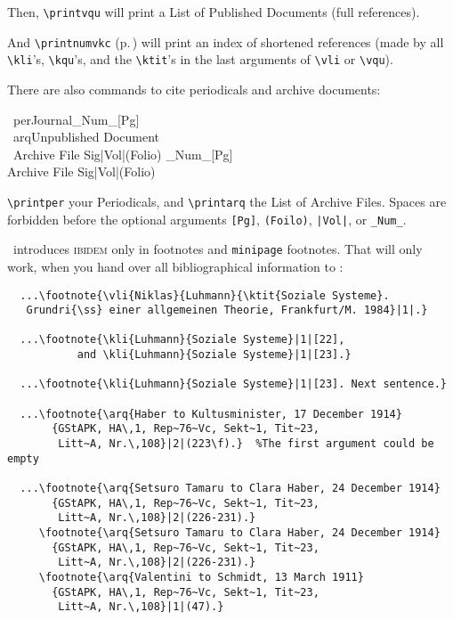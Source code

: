 \documentclass[12pt,a4paper]{article}
\newcommand{\pbs}{\string\ \unskip}
\newcommand{\bs}{\protect\pbs}
\renewcommand{\{}{{\normalfont\lbashortmem}}
\renewcommand{\}}{{\normalfont\rbashortmem}}
\begin{document}
 \vspace{-.25ex}\noindent 
 Then, \verb|\printvqu| will print a List of Published Documents 
 (full references). 

 \vspace{.75ex}\noindent 
 And \verb|\printnumvkc| (p.\,\pageref{vkc}) will print an index 
 of shortened references (made by all \verb|\kli|'s, \verb|\kqu|'s, and  
 the \verb|\ktit|'s in the last arguments of \verb|\vli| or 
 \verb|\vqu|).
 
 \vspace{.75ex}\vfill\noindent
 There are also \BibArts\hy commands to cite periodicals 
 and archive documents:
 
 \vspace{-.35ex}
 \Doppelbox
 {
  \bs per\{Journal\}\string_Num\string_[Pg]
  \\[1ex]
  \bs arq\{Unpublished Document\}
  \\ \ \{Archive File Sig\}\string|Vol\string|(Folio)
 }
 {
  _Num_[Pg]
  \\[.5ex]        
   {Archive File Sig}|Vol|(Folio)
 }

 \vspace{-.25ex}\noindent 
 \verb|\printper| your Periodicals, and \verb|\printarq| the List of Archive
 Files. Spaces are forbidden before the optional arguments \verb+[Pg]+,
 \verb+(Foilo)+, \verb+|Vol|+, or \verb+_Num_+.


\newpage
\noindent
\BibArts\ introduces \textsc{ibidem} only in footnotes and \texttt{minipage} 
footnotes. That will only work, when you hand over all bibliographical
information to \BibArts: 

{\footnotesize\begin{verbatim}
  ...\footnote{\vli{Niklas}{Luhmann}{\ktit{Soziale Systeme}. 
   Grundri{\ss} einer allgemeinen Theorie, Frankfurt/M. 1984}|1|.}

  ...\footnote{\kli{Luhmann}{Soziale Systeme}|1|[22],
           and \kli{Luhmann}{Soziale Systeme}|1|[23].}

  ...\footnote{\kli{Luhmann}{Soziale Systeme}|1|[23]. Next sentence.}

  ...\footnote{\arq{Haber to Kultusminister, 17 December 1914} 
       {GStAPK, HA\,1, Rep~76~Vc, Sekt~1, Tit~23, 
        Litt~A, Nr.\,108}|2|(223\f).}  %The first argument could be empty
				
  ...\footnote{\arq{Setsuro Tamaru to Clara Haber, 24 December 1914} 
       {GStAPK, HA\,1, Rep~76~Vc, Sekt~1, Tit~23, 
        Litt~A, Nr.\,108}|2|(226-231).}
     \footnote{\arq{Setsuro Tamaru to Clara Haber, 24 December 1914} 
       {GStAPK, HA\,1, Rep~76~Vc, Sekt~1, Tit~23, 
        Litt~A, Nr.\,108}|2|(226-231).}
     \footnote{\arq{Valentini to Schmidt, 13 March 1911} 
       {GStAPK, HA\,1, Rep~76~Vc, Sekt~1, Tit~23, 
        Litt~A, Nr.\,108}|1|(47).} 
\end{verbatim}}
\end{document}
